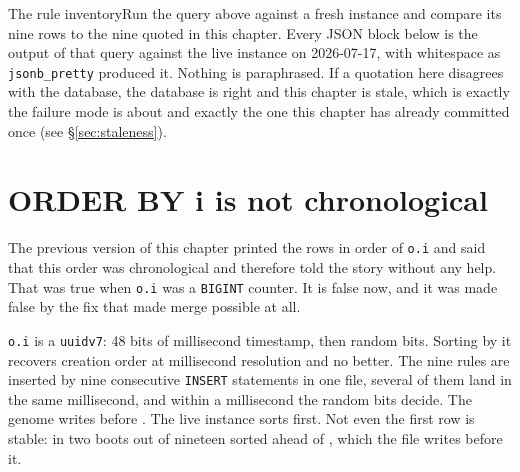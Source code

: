 \begin{Correspondence}{The rule inventory}{Run the query above against a fresh instance and compare its nine rows to the nine quoted in this chapter.}
Every JSON block below is the output of that query against the live instance on 2026-07-17, with whitespace as \texttt{jsonb\_pretty} produced it. Nothing is paraphrased. If a quotation here disagrees with the database, the database is right and this chapter is stale, which is exactly the failure mode  is about and exactly the one this chapter has already committed once (see \S\ref{sec:staleness}).
\end{Correspondence}

\section{ORDER BY i is not chronological}

The previous version of this chapter printed the rows in order of \texttt{o.i} and said that this order was chronological and therefore told the story without any help. That was true when \texttt{o.i} was a \texttt{BIGINT} counter. It is false now, and it was made false by the fix that made merge possible at all.

\texttt{o.i} is a \texttt{uuidv7}: 48 bits of millisecond timestamp, then random bits. Sorting by it recovers creation order at millisecond resolution and no better. The nine rules are inserted by nine consecutive \texttt{INSERT} statements in one file, several of them land in the same millisecond, and within a millisecond the random bits decide. The genome writes  before . The live instance sorts  first. Not even the first row is stable: in two boots out of nineteen  sorted ahead of , which the file writes before it.

